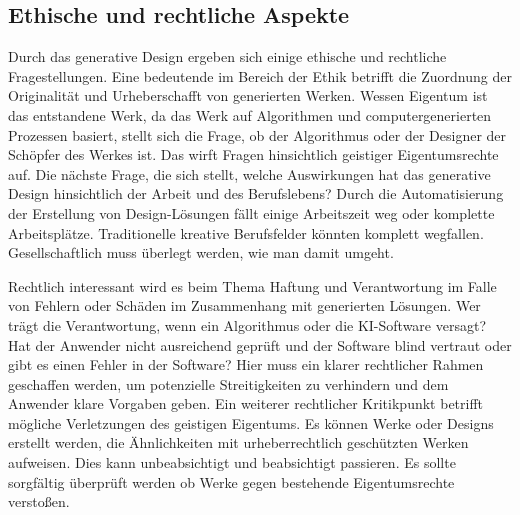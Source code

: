 \subsection*{Ethische und rechtliche Aspekte}
Durch das generative Design ergeben sich einige ethische und rechtliche Fragestellungen. Eine bedeutende im Bereich der Ethik betrifft die Zuordnung der Originalität und Urheberschafft von generierten Werken. Wessen Eigentum ist das entstandene Werk, da das Werk auf Algorithmen und computergenerierten Prozessen basiert, stellt sich die Frage, ob der Algorithmus oder der Designer der Schöpfer des Werkes ist. Das wirft Fragen hinsichtlich geistiger Eigentumsrechte auf. 
Die nächste Frage, die sich stellt, welche Auswirkungen hat das generative Design hinsichtlich der Arbeit und des Berufslebens? Durch die Automatisierung der Erstellung von Design-Lösungen fällt einige Arbeitszeit weg oder komplette Arbeitsplätze. Traditionelle kreative Berufsfelder könnten komplett wegfallen. Gesellschaftlich muss überlegt werden, wie man damit umgeht. 

Rechtlich interessant wird es beim Thema Haftung und Verantwortung im Falle von Fehlern oder Schäden im Zusammenhang mit generierten Lösungen. Wer trägt die Verantwortung, wenn ein Algorithmus oder die KI-Software versagt? Hat der Anwender nicht ausreichend geprüft und der Software blind vertraut oder gibt es einen Fehler in der Software? Hier muss ein klarer rechtlicher Rahmen geschaffen werden, um potenzielle Streitigkeiten zu verhindern und dem Anwender klare Vorgaben geben. 
Ein weiterer rechtlicher Kritikpunkt betrifft mögliche Verletzungen des geistigen Eigentums. Es können Werke oder Designs erstellt werden, die Ähnlichkeiten mit urheberrechtlich geschützten Werken aufweisen. Dies kann unbeabsichtigt und beabsichtigt passieren. Es sollte sorgfältig überprüft werden ob Werke gegen bestehende Eigentumsrechte verstoßen. \autocite{6}
